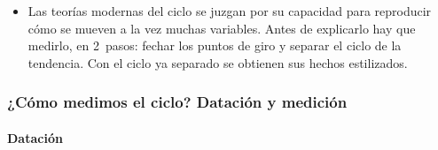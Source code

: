 \documentclass[11pt]{article}
\begin{document}
\begin{itemize}
\item Las teorías modernas del ciclo se juzgan por su capacidad para reproducir cómo se mueven a la vez muchas variables. Antes de explicarlo hay que medirlo, en 2~pasos: fechar los puntos de giro y separar el ciclo de la tendencia. Con el ciclo ya separado se obtienen sus hechos estilizados.
\end{itemize}

\subsubsection{¿Cómo medimos el ciclo? Datación y medición}\label{sec:medir}

\paragraph{Datación}
\end{document}
